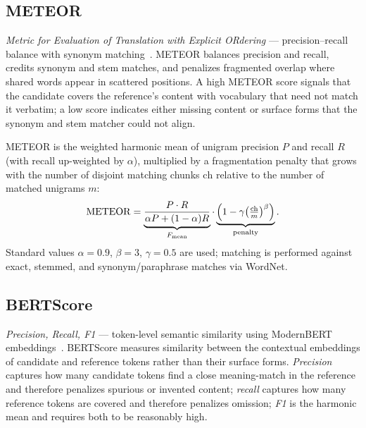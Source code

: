 \subsection{METEOR}

\emph{Metric for Evaluation of Translation with Explicit ORdering} --- precision--recall balance with synonym matching~\cite{Banerjee2005}. METEOR balances precision and recall, credits synonym and stem matches, and penalizes fragmented overlap where shared words appear in scattered positions. A high METEOR score signals that the candidate covers the reference's content with vocabulary that need not match it verbatim; a low score indicates either missing content or surface forms that the synonym and stem matcher could not align.

METEOR is the weighted harmonic mean of unigram precision $P$ and recall $R$ (with recall up-weighted by $\alpha$), multiplied by a fragmentation penalty that grows with the number of disjoint matching chunks $\mathrm{ch}$ relative to the number of matched unigrams $m$:
\begin{equation}
\label{eq:meteor}
\mathrm{METEOR} = \underbrace{\frac{P \cdot R}{\alpha P + (1 - \alpha) R}}_{F_{\mathrm{mean}}}
\cdot
\underbrace{\Bigl(1 - \gamma \bigl(\tfrac{\mathrm{ch}}{m}\bigr)^{\beta}\Bigr)}_{\text{penalty}}.
\end{equation}
Standard values $\alpha = 0.9$, $\beta = 3$, $\gamma = 0.5$ are used; matching is performed against exact, stemmed, and synonym/paraphrase matches via WordNet.

\subsection{BERTScore}

\emph{Precision, Recall, F1} --- token-level semantic similarity using ModernBERT embeddings~\cite{Zhang2020}. BERTScore measures similarity between the contextual embeddings of candidate and reference tokens rather than their surface forms. \emph{Precision} captures how many candidate tokens find a close meaning-match in the reference and therefore penalizes spurious or invented content; \emph{recall} captures how many reference tokens are covered and therefore penalizes omission; \emph{F1} is the harmonic mean and requires both to be reasonably high.

